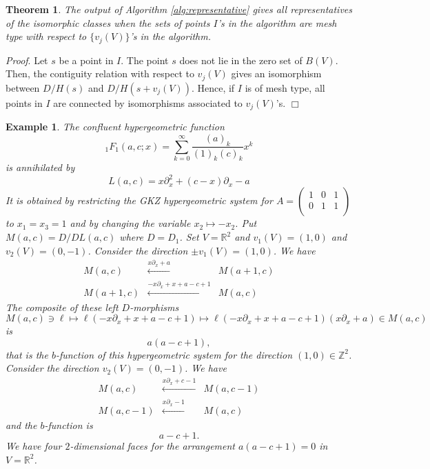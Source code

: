 \documentclass{article}
\def\RR{\mathbb{R}}
\def\ZZ{\mathbb{Z}}
\def\pd#1{\partial_{#1}}
\def\qed{\hfill $\Box$ \medbreak}
\newtheorem{theorem}{Theorem}
\newtheorem{example}{Example}
\begin{document}
\begin{theorem}
The output of Algorithm \ref{alg:representative} gives
all representatives of the isomorphic classes
when the sets of points $I$'s in the algorithm are mesh type
with respect to $\{v_j(V)\}$'s in the algorithm.
\end{theorem}

{\it Proof}\/.
Let $s$ be a point in $I$.
The point $s$ does not lie in the zero set of $B(V)$.
Then, 
the contiguity relation with respect to $v_j(V)$ gives 
an isomorphism 
between $D/H(s)$ and $D/H(s+v_j(V))$.
Hence, if $I$ is of mesh type, all points in $I$ are connected 
by isomorphisms associated to $v_j(V)$'s.
\qed

\begin{example}\rm  \label{ex:1F1}
The confluent hypergeometric function
$$
{}_1 F_1(a,c;x)= \sum_{k=0}^\infty \frac{(a)_k}{(1)_k (c)_k} x^k
$$
is annihilated by
\begin{equation}
L(a,c)=x \pd{x}^2 + (c-x) \pd{x} -a 
\end{equation}
It is obtained by restricting the GKZ hypergeometric system for
$A=\left(\begin{array}{ccc}
1&0&1\\
0&1&1\\
\end{array}\right)$
to $x_1=x_3=1$ and by changing the variable $x_2 \mapsto -x_2$.
Put $M(a,c)=D/D L(a,c)$ where $D=D_1$.
Set $V=\RR^2$ and $v_1(V)=(1,0)$ and $v_2(V)=(0,-1)$.
Consider the direction $\pm v_1(V)=(1,0)$.
We have
\begin{eqnarray}
M(a,c)   &\stackrel{ x \pd{x}+a }{\longleftarrow}& M(a+1,c) \\
M(a+1,c) &\stackrel{ -x \pd{x}+x+a-c+1 }{\longleftarrow}& M(a,c) 
\end{eqnarray}
The composite of these left $D$-morphisms
\begin{equation*}
M(a,c) \ni \ell \mapsto \ell (-x\pd{x}+x+a-c+1) 
                \mapsto \ell (-x\pd{x}+x+a-c+1) (x\pd{x}+a) \in M(a,c)
\end{equation*}
is 
\begin{equation} \label{eq:conti-bf-1F1-a}
a(a-c+1),
\end{equation}
that is the $b$-function of this hypergeometric system for the direction $(1,0) \in \ZZ^2$.
Consider the direction $v_2(V)=(0,-1)$.
We have
\begin{eqnarray}
M(a,c)   &\stackrel{ x \pd{x}+c-1 }{\longleftarrow}& M(a,c-1) \label{eq:1F1_conti_c1}\\
M(a,c-1) &\stackrel{ x \pd{x}-1 }{\longleftarrow}& M(a,c)  \label{eq:1F1_conti_c2}
\end{eqnarray}
and the $b$-function is  
\begin{equation} \label{eq:conti-bf-1F1-c}
a-c+1.
\end{equation}
We have four $2$-dimensional faces for the arrangement
$a (a-c+1)=0$ in $V=\RR^2$.


\end{example}
\end{document}
